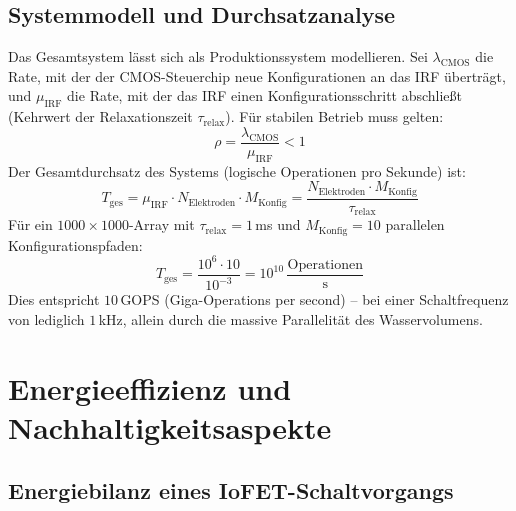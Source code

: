 ﻿\documentclass[a4paper,12pt]{scrreprt}
\theoremstyle{definition}
\begin{document}
\subsection{Systemmodell und Durchsatzanalyse}

Das Gesamtsystem lässt sich als Produktionssystem modellieren. Sei
$\lambda_{\mathrm{CMOS}}$ die Rate, mit der der CMOS-Steuerchip neue
Konfigurationen an das IRF überträgt, und $\mu_{\mathrm{IRF}}$ die Rate,
mit der das IRF einen Konfigurationsschritt abschließt (Kehrwert der
Relaxationszeit $\tau_{\mathrm{relax}}$). Für stabilen Betrieb muss gelten:
\begin{equation}
	\rho = \frac{\lambda_{\mathrm{CMOS}}}{\mu_{\mathrm{IRF}}} < 1
	\label{eq:stabilitaetsbedingung}
\end{equation}
Der Gesamtdurchsatz des Systems (logische Operationen pro Sekunde) ist:
\begin{equation}
	T_{\mathrm{ges}} = \mu_{\mathrm{IRF}} \cdot N_{\mathrm{Elektroden}} \cdot M_{\mathrm{Konfig}}
	= \frac{N_{\mathrm{Elektroden}} \cdot M_{\mathrm{Konfig}}}{\tau_{\mathrm{relax}}}
	\label{eq:gesamtdurchsatz}
\end{equation}
Für ein $1000 \times 1000$-Array mit $\tau_{\mathrm{relax}} = 1$\,ms und
$M_{\mathrm{Konfig}} = 10$ parallelen Konfigurationspfaden:
\begin{equation}
	T_{\mathrm{ges}} = \frac{10^6 \cdot 10}{10^{-3}} = 10^{10}\,\frac{\mathrm{Operationen}}{\mathrm{s}}
	\label{eq:durchsatz_beispiel}
\end{equation}
Dies entspricht $10$\,GOPS (Giga-Operations per second) -- bei einer
Schaltfrequenz von lediglich $1$\,kHz, allein durch die massive Parallelität
des Wasservolumens.

\section{Energieeffizienz und Nachhaltigkeitsaspekte}

\subsection{Energiebilanz eines IoFET-Schaltvorgangs}
\end{document}
